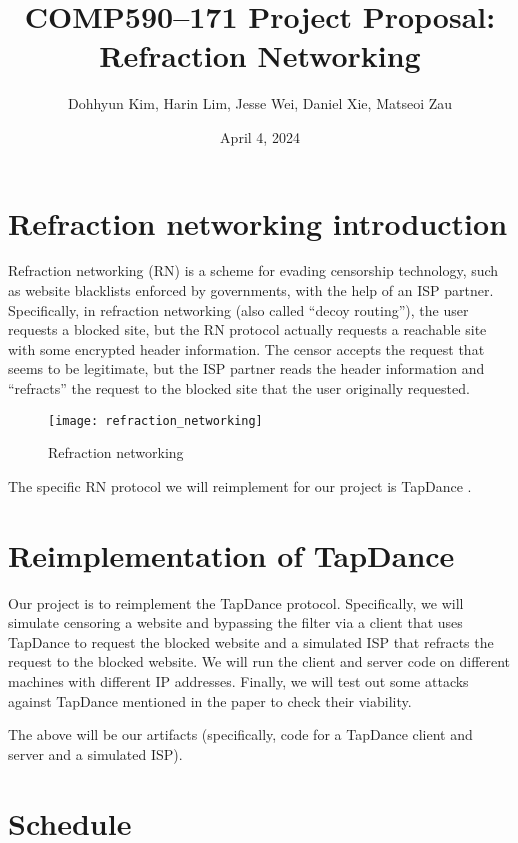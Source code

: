 \documentclass{article}
\title{COMP590--171 Project Proposal: Refraction Networking}
\author{Dohhyun Kim, Harin Lim, Jesse Wei, Daniel Xie, Matseoi Zau}
\date{April 4, 2024}
\begin{document}
\maketitle

\section{Refraction networking introduction}

Refraction networking (RN) is a scheme for evading censorship technology, such as website blacklists enforced by governments, with the help of an ISP partner. Specifically, in refraction networking (also called ``decoy routing''), the user requests a blocked site, but the RN protocol actually requests a reachable site with some encrypted header information. The censor accepts the request that seems to be legitimate, but the ISP partner reads the header information and ``refracts'' the request to the blocked site that the user originally requested.

\begin{figure}[h]
    \centering
    \texttt{[image: refraction\_networking]}
    \caption{Refraction networking \cite{refraction_network}}
\end{figure}

The specific RN protocol we will reimplement for our project is TapDance \cite{tapdance}.

\section{Reimplementation of TapDance}

Our project is to reimplement the TapDance protocol. Specifically, we will simulate censoring a website and bypassing the filter via a client that uses TapDance to request the blocked website and a simulated ISP that refracts the request to the blocked website. We will run the client and server code on different machines with different IP addresses. Finally, we will test out some attacks against TapDance mentioned in the paper to check their viability.

The above will be our artifacts (specifically, code for a TapDance client and server and a simulated ISP).

\section{Schedule}
\end{document}
